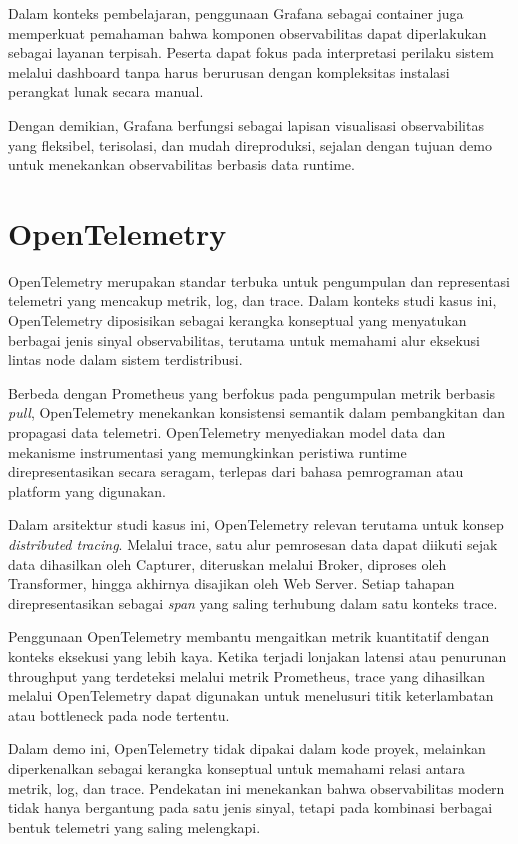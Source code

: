 Dalam konteks pembelajaran, penggunaan Grafana sebagai container juga memperkuat pemahaman bahwa komponen observabilitas dapat diperlakukan sebagai layanan terpisah. Peserta dapat fokus pada interpretasi perilaku sistem melalui dashboard tanpa harus berurusan dengan kompleksitas instalasi perangkat lunak secara manual.

Dengan demikian, Grafana berfungsi sebagai lapisan visualisasi observabilitas yang fleksibel, terisolasi, dan mudah direproduksi, sejalan dengan tujuan demo untuk menekankan observabilitas berbasis data runtime.


\section{OpenTelemetry}

OpenTelemetry merupakan standar terbuka untuk pengumpulan dan representasi telemetri yang mencakup metrik, log, dan trace. Dalam konteks studi kasus ini, OpenTelemetry diposisikan sebagai kerangka konseptual yang menyatukan berbagai jenis sinyal observabilitas, terutama untuk memahami alur eksekusi lintas node dalam sistem terdistribusi.

Berbeda dengan Prometheus yang berfokus pada pengumpulan metrik berbasis \emph{pull}, OpenTelemetry menekankan konsistensi semantik dalam pembangkitan dan propagasi data telemetri. OpenTelemetry menyediakan model data dan mekanisme instrumentasi yang memungkinkan peristiwa runtime direpresentasikan secara seragam, terlepas dari bahasa pemrograman atau platform yang digunakan.

Dalam arsitektur studi kasus ini, OpenTelemetry relevan terutama untuk konsep \emph{distributed tracing}. Melalui trace, satu alur pemrosesan data dapat diikuti sejak data dihasilkan oleh Capturer, diteruskan melalui Broker, diproses oleh Transformer, hingga akhirnya disajikan oleh Web Server. Setiap tahapan direpresentasikan sebagai \emph{span} yang saling terhubung dalam satu konteks trace.

Penggunaan OpenTelemetry membantu mengaitkan metrik kuantitatif dengan konteks eksekusi yang lebih kaya. Ketika terjadi lonjakan latensi atau penurunan throughput yang terdeteksi melalui metrik Prometheus, trace yang dihasilkan melalui OpenTelemetry dapat digunakan untuk menelusuri titik keterlambatan atau bottleneck pada node tertentu.

Dalam demo ini, OpenTelemetry tidak dipakai dalam kode proyek, melainkan diperkenalkan sebagai kerangka konseptual untuk memahami relasi antara metrik, log, dan trace. Pendekatan ini menekankan bahwa observabilitas modern tidak hanya bergantung pada satu jenis sinyal, tetapi pada kombinasi berbagai bentuk telemetri yang saling melengkapi.

